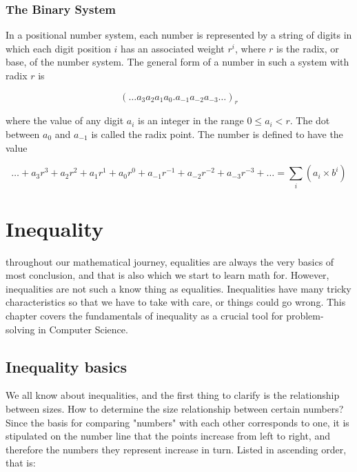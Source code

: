 \documentclass[
	12pt, %
	fleqn, %
	a4paper, %
]{LegrandOrangeBook}
\begin{document}
\subsection{The Binary System}
\begin{definition}
    In a positional number system, each number is represented by a string of digits in which each digit position \( i \) has an associated weight \( r^i \), where \( r \) is the radix, or base, of the number system. The general form of a number in such a system with radix \( r \) is

\[
(\ldots a_3a_2a_1a_0.a_{-1}a_{-2}a_{-3}\ldots)_r
\]

where the value of any digit \( a_i \) is an integer in the range \( 0 \leq a_i < r \). The dot between \( a_0 \) and \( a_{-1} \) is called the radix point. The number is defined to have the value

\[
\ldots + a_3r^3 + a_2r^2 + a_1r^1 + a_0r^0 + a_{-1}r^{-1} + a_{-2}r^{-2} + a_{-3}r^{-3} + \ldots = \sum_i (a_i \times b^i)
\]


\end{definition}

\chapterspaceabove{6.75cm} 
\chapterspacebelow{7.25cm} 
\chapter{Inequality}
throughout our mathematical journey, equalities are always the very basics of most conclusion, and that is also which we start to learn math for. However, inequalities are not such a know thing as equalities.
Inequalities have many tricky characteristics so that we have to take with care, or things could go wrong. This chapter covers the fundamentals of inequality as a crucial tool for problem-solving in Computer Science.

\section{Inequality basics}
We all know about inequalities, and the first thing to clarify is the relationship between sizes. How to determine the size relationship between certain numbers? Since the basis for comparing "numbers" with each other corresponds to one, it is stipulated on the number line that the points increase from left to right, and therefore the numbers they represent increase in turn. Listed in ascending order, that is:
\end{document}
